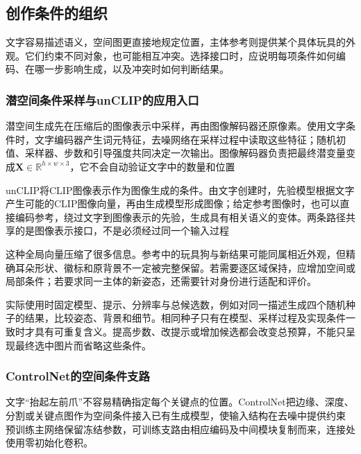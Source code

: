 \subsection{创作条件的组织}
\label{sec:vision-generation-conditions}

文字容易描述语义，空间图更直接地规定位置，主体参考则提供某个具体玩具的外观。它们约束不同对象，也可能相互冲突。选择接口时，应说明每项条件如何编码、在哪一步影响生成，以及冲突时如何判断结果。

\subsubsection{潜空间条件采样与unCLIP的应用入口}
\label{sec:vision-generation-latent-entry}

潜空间生成先在压缩后的图像表示中采样，再由图像解码器还原像素。使用文字条件时，文字编码器产生词元特征，去噪网络在采样过程中读取这些特征；随机初值、采样器、步数和引导强度共同决定一次输出。图像解码器负责把最终潜变量变成$\bm{X}\in\mathbb{R}^{h\times w\times3}$，它不会自动验证文字中的数量和位置

unCLIP将CLIP图像表示作为图像生成的条件。由文字创建时，先验模型根据文字产生可能的CLIP图像向量，再由生成模型形成图像；给定参考图像时，也可以直接编码参考，绕过文字到图像表示的先验，生成具有相关语义的变体。两条路径共享的是图像表示接口，不是必须经过同一个输入过程

这种全局向量压缩了很多信息。参考中的玩具狗与新结果可能同属相近外观，但精确耳朵形状、徽标和原背景不一定被完整保留。若需要逐区域保持，应增加空间或局部条件；若要求同一主体的新姿态，还需要针对身份进行适配和评价。

实际使用时固定模型、提示、分辨率与总候选数，例如对同一描述生成四个随机种子的结果，比较姿态、背景和细节。相同种子只有在模型、采样过程及实现条件一致时才具有可重复含义。提高步数、改提示或增加候选都会改变总预算，不能只呈现最终选中图片而省略这些条件。

\subsubsection{ControlNet的空间条件支路}
\label{sec:vision-generation-controlnet}

文字“抬起左前爪”不容易精确指定每个关键点的位置。ControlNet把边缘、深度、分割或关键点图作为空间条件接入已有生成模型，使输入结构在去噪中提供约束
预训练主网络保留冻结参数，可训练支路由相应编码及中间模块复制而来，连接处使用零初始化卷积。


